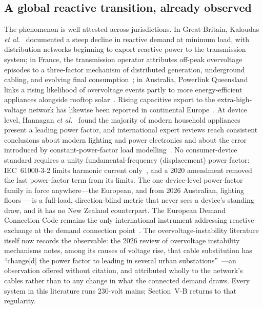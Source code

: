 \documentclass[journal]{IEEEtran}
\begin{document}
\subsection{A global reactive transition, already observed}
The phenomenon is well attested across jurisdictions. In Great Britain, Kaloudas
\emph{et al.}~\cite{kaloudas2014,kaloudas2017} documented a steep decline in
reactive demand at minimum load, with distribution networks beginning to export
reactive power to the transmission system; in France, the transmission operator
attributes off-peak overvoltage episodes to a three-factor mechanism of
distributed generation, underground cabling, and evolving final
consumption~\cite{rte_bilan}; in Australia, Powerlink Queensland links a rising
likelihood of overvoltage events partly to more energy-efficient appliances
alongside rooftop solar~\cite{powerlink_seq}. Rising capacitive export to the
extra-high-voltage network has likewise been reported in continental
Europe~\cite{tazky2021}. At device level, Hannagan \emph{et
al.}~\cite{hannagan2023} found the majority of modern household appliances
present a leading power factor, and international expert reviews reach
consistent conclusions about modern lighting and power electronics and about
the error introduced by constant-power-factor load
modelling~\cite{cigre_tb719,epri_loadmodel}. No consumer-device standard requires
a unity fundamental-frequency (displacement) power factor: IEC~61000-3-2 limits
harmonic current only~\cite{iec61000_3_2}, and a 2020 amendment removed the
last power-factor term from its limits. The one device-level power-factor
family in force anywhere---the European, and from 2026 Australian, lighting
floors~\cite{eu_lighting2020}---is a full-load, direction-blind metric that
never sees a device's standing draw, and it has no New Zealand counterpart.
The European Demand Connection Code remains the only international instrument
addressing reactive exchange at the demand connection
point~\cite{eu_dcc}. The
overvoltage-instability literature itself now records the observable: the 2026
review of overvoltage instability mechanisms notes, among its causes of voltage
rise, that cable substitution has ``change[d] the power factor to leading in
several urban substations''~\cite{vournas2026review}---an observation offered
without citation, and attributed wholly to the network's cables rather than to
any change in what the connected demand draws. Every system in this literature
runs 230-volt mains; Section~V-B returns to that regularity.
\end{document}

